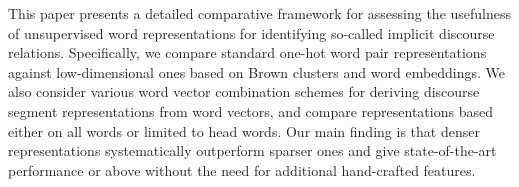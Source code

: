 This paper presents a detailed comparative framework for assessing the usefulness of unsupervised word representations for identifying so-called implicit discourse relations. Specifically, we compare standard one-hot word pair representations against low-dimensional ones based on Brown clusters and word embeddings. We also consider various word vector combination schemes for deriving discourse segment representations from word vectors, and compare representations based either on all words or limited to head words. Our main finding is that denser representations systematically outperform sparser ones and give state-of-the-art performance or above without the need for additional hand-crafted features.
